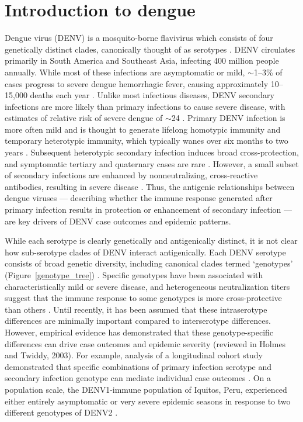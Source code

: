 \section{Introduction to dengue}
Dengue virus (DENV) is a mosquito-borne flavivirus which consists of four genetically distinct clades, canonically thought of as serotypes \citep{lanciotti1997molecular}.
DENV circulates primarily in South America and Southeast Asia, infecting 400 million people annually.
While most of these infections are asymptomatic or mild, $\sim$1--3\% of cases progress to severe dengue hemorrhagic fever, causing approximately 10--15,000 deaths each year \citep{bhatt2013global}.
Unlike most infectious diseases, DENV secondary infections are more likely than primary infections to cause severe disease, with estimates of relative risk of severe dengue of $\sim$24 \citep{mizumoto2014risk}.
Primary DENV infection is more often mild and is thought to generate lifelong homotypic immunity and temporary heterotypic immunity, which typically wanes over six months to two years \citep{katzelnick2016neutralizing,sabin1952research}.
Subsequent heterotypic secondary infection induces broad cross-protection, and symptomatic tertiary and quaternary cases are rare  \citep{gibbons2007analysis,olkowski2013reduced}.
However, a small subset of secondary infections are enhanced by nonneutralizing, cross-reactive antibodies, resulting in severe disease \citep{halstead1979vivo,katzelnick2017antibody,sangkawibha1984risk}.
Thus, the antigenic relationships between dengue viruses --- describing whether the immune response generated after primary infection results in protection or enhancement of secondary infection --- are key drivers of DENV case outcomes and epidemic patterns.

While each serotype is clearly genetically and antigenically distinct, it is not clear how sub-serotype clades of DENV interact antigenically.
Each DENV serotype consists of broad genetic diversity, including canonical clades termed `genotypes' (Figure~\ref{genotype_tree}) \citep{rico1990molecular,twiddy2003inferring}.
Specific genotypes have been associated with characteristically mild or severe disease, and heterogeneous neutralization titers suggest that the immune response to some genotypes is more cross-protective than others \citep{gentry1982identification,russell1967dengue}.
Until recently, it has been assumed that these intraserotype differences are minimally important compared to interserotype differences.
However, empirical evidence has demonstrated that these genotype-specific differences can drive case outcomes and epidemic severity (reviewed in Holmes and Twiddy, 2003).
For example, analysis of a longitudinal cohort study demonstrated that specific combinations of primary infection serotype and secondary infection genotype can mediate individual case outcomes \citep{ohainle2011dynamics}.
On a population scale, the DENV1-immune population of Iquitos, Peru, experienced either entirely asymptomatic or very severe epidemic seasons in response to two different genotypes of DENV2 \citep{kochel2002effect}.

